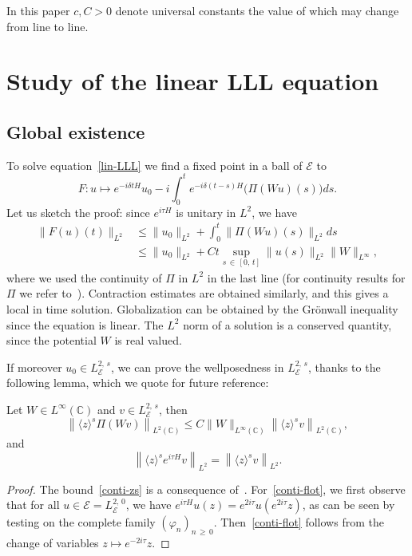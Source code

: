 \documentclass[AHL,Unicode,published]{cedram}
\newcommand{\C}{\mathbb{C}}
\newcommand{\E}{\mathcal{E}}
\newcommand{\<}{\langle}
\renewcommand{\>}{\rangle}
\renewcommand{\phi}{\varphi}
\begin{document}
In this paper $c,C>0$ denote universal constants the value of which may change from line to line.


\section{Study of the linear LLL equation}\label{Sect3}


\subsection{Global existence}
To solve equation~\eqref{lin-LLL} we find a fixed point in a ball of $\E$ to
\[
F: u \longmapsto e^{-i \delta t H}u_0-i \int_0^te^{-i\delta (t-s) H} \big(\Pi(Wu)(s)\big)ds.
\]
Let us sketch the proof: since $e^{i\tau H}$ is unitary in $L^2$, we have
\begin{align*}
\|F(u)(t)\|_{L^2} &\leq \|u_0\|_{L^2}+ \int_{0}^t \|\Pi(Wu)(s)\|_{L^2} ds \\
&\leq \|u_0\|_{L^2}+ Ct \sup_{s\,\in\,[0,\,t]} \|u(s)\|_{L^2} \|W\|_{L^\infty},
\end{align*}
where we used the continuity of $\Pi$ in $L^2$ in the last line (for continuity results for $\Pi$ we refer to~\cite[Proposition~3.1]{GGT}). Contraction estimates are obtained similarly, and this gives a local in time solution. Globalization can be obtained by the Gr\"onwall inequality since the equation is linear. The $L^2$ norm of a solution is a conserved quantity, since the potential $W$ is real valued.

If moreover $u_0 \in L^{2,\,s}_\E$, we can prove the wellposedness in $L^{2,\,s}_\E$, thanks to the following lemma, which we quote for future reference:

\begin{lemm}
Let $W \in L^{\infty}(\C)$ and $v \in L^{2,\,s}_\E$, then
\begin{equation}\label{conti-zs}
\left\| \langle z \rangle^s \Pi \left(Wv\right) \right\|_{L^2(\C)} \leq C \| W\|_{L^\infty(\C)} \left\|\langle z \rangle^s v\right\|_{L^2(\C)},
\end{equation}
and
\begin{equation}\label{conti-flot}
\left\| \langle z \rangle^s e^{i\tau H} v \right\|_{L^2} = \left\| \langle z \rangle^s v \right\|_{L^2}.
\end{equation}
\end{lemm}

\begin{proof}
The bound~\eqref{conti-zs} is a consequence of~\cite[Proposition~3.1]{GGT}. For~\eqref{conti-flot}, we first observe that for all $u \in \E=L^{2,\,0}_\E$, we have $e^{i \tau H}u(z)=e^{2i\tau }u(e^{2i\tau}z)$, as can be seen by testing on the complete family $(\phi_n)_{n\,\geq\,0}$. Then~\eqref{conti-flot} follows from the change of variables $z \mapsto e^{-2i\tau }z$.
\end{proof}
\end{document}
